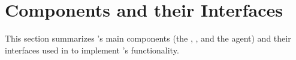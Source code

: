  \section{Components and their Interfaces}
 \label{sec:components}


This section summarizes \ipc's main components (the \gw, \sa, and the \ipc agent) and their interfaces used in  to implement \ipc's functionality.





    
    

